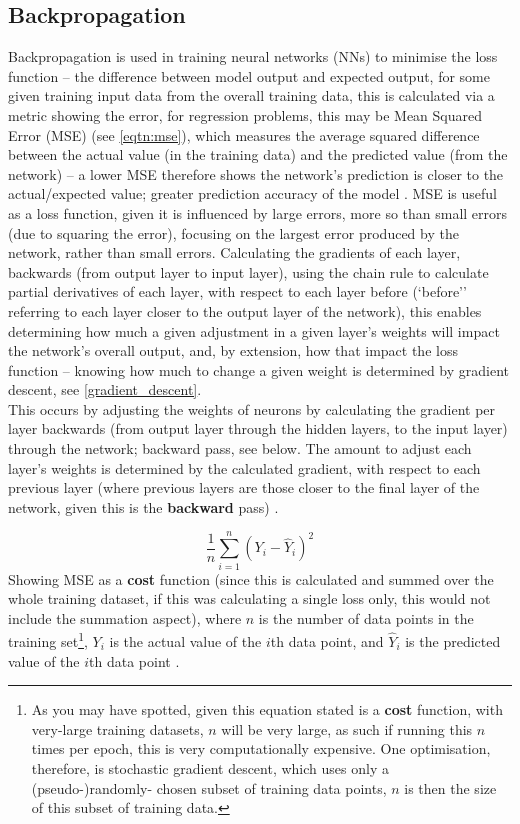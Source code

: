 \subsection{Backpropagation}
\label{subsec:backpropagation}
Backpropagation is used in training neural networks (NNs) to minimise the loss function -- the difference between model output and expected output, for some given training input data from the overall training data, this is calculated via a metric showing the error, for regression problems, this may be Mean Squared Error (MSE) (see \cref{eqtn:mse}), which measures the average squared difference between the actual value (in the training data) and the predicted value (from the network) \citep{geeks:mse} -- a lower MSE therefore shows the network's prediction is closer to the actual/expected value; greater prediction accuracy of the model \citep{geeks:mse}. MSE is useful as a loss function, given it is influenced by large errors, more so than small errors (due to squaring the error), focusing on the largest error produced by the network, rather than small errors. Calculating the gradients of each layer, backwards (from output layer to input layer), using the chain rule to calculate partial derivatives of each layer, with respect to each layer before (`before'' referring to each layer closer to the output layer of the network), this enables determining how much a given adjustment in a given layer's weights will impact the network's overall output, and, by extension, how that impact the loss function -- knowing how much to change a given weight is determined by gradient descent, see \cref{gradient_descent}.\\
This occurs by adjusting the weights of neurons by calculating the gradient per layer backwards (from output layer through the hidden layers, to the input layer) through the network; backward pass, see below. The amount to adjust each layer's weights is determined by the calculated gradient, with respect to each previous layer (where previous layers are those closer to the final layer of the network, given this is the \textbf{backward} pass) \citep{analyticsvidhya:gradient-descent_backpropagation}.
\begin{center}
    \begin{equation}\label{eqtn:mse}
        \frac{1}{n}\sum_{i=1}^{n}(Y_i-\hat{Y}_{i})^{2}
    \end{equation}
    Showing MSE as a \textbf{cost} function (since this is calculated and summed over the whole training dataset, if this was calculating a single loss only, this would not include the summation aspect), where $n$ is the number of data points in the training set\footnote{As you may have spotted, given this equation stated is a \textbf{cost} function, with very-large training datasets, $n$ will be very large, as such if running this $n$ times per epoch, this is very computationally expensive. One optimisation, therefore, is stochastic gradient descent, which uses only a (pseudo-)randomly- chosen subset of training data points, $n$ is then the size of this subset of training data.}, $Y_i$ is the actual value of the $i$th data point, and $\hat{Y}_i$ is the predicted value of the $i$th data point \citep{geeks:mse}.
\end{center}
